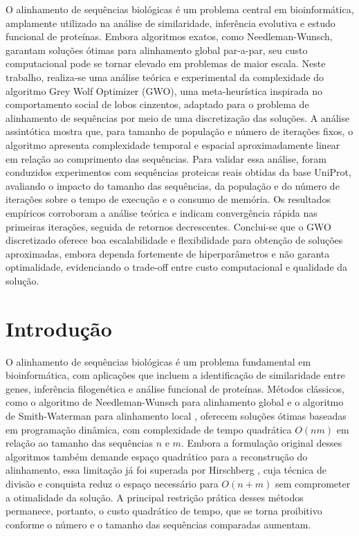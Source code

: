 \documentclass[12pt]{article}
\begin{document}
\begin{resumo}
    O alinhamento de sequências biológicas é um problema central em bioinformática, amplamente utilizado na análise de similaridade, inferência evolutiva e estudo funcional de proteínas. Embora algoritmos exatos, como Needleman-Wunsch, garantam soluções ótimas para alinhamento global par-a-par, seu custo computacional pode se tornar elevado em problemas de maior escala. Neste trabalho, realiza-se uma análise teórica e experimental da complexidade do algoritmo Grey Wolf Optimizer (GWO), uma meta-heurística inspirada no comportamento social de lobos cinzentos, adaptado para o problema de alinhamento de sequências por meio de uma discretização das soluções. A análise assintótica mostra que, para tamanho de população e número de iterações fixos, o algoritmo apresenta complexidade temporal e espacial aproximadamente linear em relação ao comprimento das sequências. Para validar essa análise, foram conduzidos experimentos com sequências proteicas reais obtidas da base UniProt, avaliando o impacto do tamanho das sequências, da população e do número de iterações sobre o tempo de execução e o consumo de memória. Os resultados empíricos corroboram a análise teórica e indicam convergência rápida nas primeiras iterações, seguida de retornos decrescentes. Conclui-se que o GWO discretizado oferece boa escalabilidade e flexibilidade para obtenção de soluções aproximadas, embora dependa fortemente de hiperparâmetros e não garanta optimalidade, evidenciando o trade-off entre custo computacional e qualidade da solução.
\end{resumo}

\section{Introdução}

O alinhamento de sequências biológicas é um problema fundamental em bioinformática, com aplicações que incluem a
identificação de similaridade entre genes, inferência filogenética e análise funcional de proteínas. Métodos clássicos,
como o algoritmo de Needleman-Wunsch para alinhamento global \cite{needleman} e o algoritmo de Smith-Waterman para
alinhamento local \cite{smith}, oferecem soluções ótimas baseadas em programação dinâmica, com complexidade de tempo
quadrática $O(nm)$ em relação ao tamanho das sequências $n$ e $m$. Embora a formulação original desses algoritmos também
demande espaço quadrático para a reconstrução do alinhamento, essa limitação já foi superada por Hirschberg
\cite{hirschberg}, cuja técnica de divisão e conquista reduz o espaço necessário para $O(n+m)$ sem comprometer a
otimalidade da solução. A principal restrição prática desses métodos permanece, portanto, o custo quadrático de tempo,
que se torna proibitivo conforme o número e o tamanho das sequências comparadas aumentam.
\end{document}
